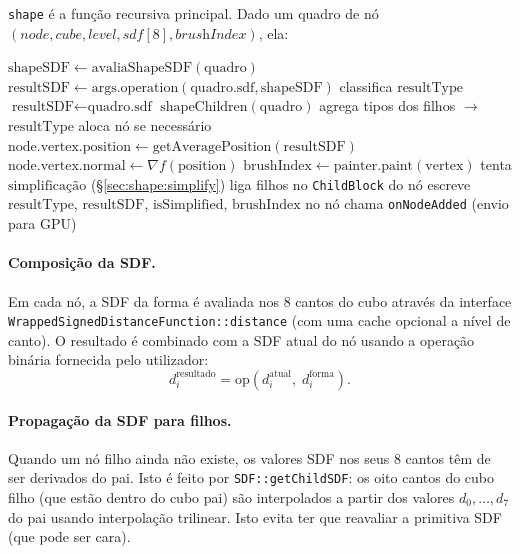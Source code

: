 \documentclass[10pt,a4paper]{article}
\begin{document}
\lstinline{shape} é a função recursiva principal. Dado um quadro de
nó $(\textit{node}, \textit{cube}, \textit{level}, \textit{sdf}[8],
\textit{brushIndex})$, ela:

\begin{algorithm}[H]
\caption{\lstinline{shape}(quadro, args)}
\label{alg:shape}
\begin{algorithmic}[1]
\State $\text{shapeSDF} \leftarrow \text{avaliaShapeSDF}(\text{quadro})$
  \State $\text{resultSDF} \leftarrow \text{args.operation}(\text{quadro.sdf}, \text{shapeSDF})$
  \State classifica $\text{resultType}$
\Else
    \State $\text{resultSDF} \leftarrow \text{quadro.sdf}$ 
  \Else
    \State $\text{shapeChildren}(\text{quadro})$ 
    \State agrega tipos dos filhos $\to$ $\text{resultType}$
  \EndIf
\EndIf
{}
  \State aloca nó se necessário
  \State $\text{node.vertex.position} \leftarrow \text{getAveragePosition}(\text{resultSDF})$
  \State $\text{node.vertex.normal} \leftarrow \nabla f(\text{position})$
    \State $\text{brushIndex} \leftarrow \text{painter.paint}(\text{vertex})$
  \Else
    \State tenta $\text{simplificação}$ (\S\ref{sec:shape:simplify})
    \State liga filhos no \lstinline{ChildBlock} do nó
  \EndIf
\EndIf
\State escreve $\text{resultType}$, $\text{resultSDF}$, $\text{isSimplified}$, $\text{brushIndex}$ no nó
  \State chama \lstinline{onNodeAdded} (envio para GPU)
\EndIf
\end{algorithmic}
\end{algorithm}

\paragraph{Composição da SDF.}
Em cada nó, a SDF da forma é avaliada nos 8 cantos do cubo através
da interface \lstinline{WrappedSignedDistanceFunction::distance}
(com uma cache opcional a nível de canto). O resultado é combinado
com a SDF atual do nó usando a operação binária fornecida pelo
utilizador:
\[
  d_i^{\text{resultado}} = \text{op}(d_i^{\text{atual}},\; d_i^{\text{forma}}).
\]

\paragraph{Propagação da SDF para filhos.}
Quando um nó filho ainda não existe, os valores SDF nos seus 8 cantos
têm de ser derivados do pai. Isto é feito por
\lstinline{SDF::getChildSDF}: os oito cantos do cubo filho (que estão
dentro do cubo pai) são interpolados a partir dos valores
$d_0,\ldots,d_7$ do pai usando interpolação trilinear. Isto evita
ter que reavaliar a primitiva SDF (que pode ser cara).
\end{document}
